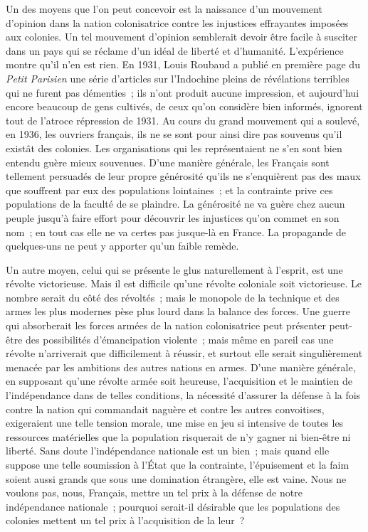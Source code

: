 \documentclass[french,twoside]{book} %
\begin{document}
\noindent Un des moyens que l'on peut concevoir est la naissance d'un mouvement d'opinion dans la nation colonisatrice contre les injustices effrayantes imposées aux colonies. Un tel mouvement d'opinion semblerait devoir être facile à susciter dans un pays qui se réclame d'un idéal de liberté et d'humanité. L'expérience montre qu'il n'en est rien. En 1931, Louis Roubaud a publié en première page du {\itshape Petit Parisien} une série d'articles sur l'Indochine pleins de révélations terribles qui ne furent pas démenties ; ils n'ont produit aucune impression, et aujourd'hui encore beaucoup de gens cultivés, de ceux qu'on considère bien informés, ignorent tout de l'atroce répression de 1931. Au cours du grand mouvement qui a soulevé, en 1936, les ouvriers français, ils ne se sont pour ainsi dire pas souvenus qu'il existât des colonies. Les organisations qui les représentaient ne s'en sont bien entendu guère mieux souvenues. D'une manière générale, les Français sont tellement persuadés de leur propre générosité qu'ils ne s'enquièrent pas des maux que souffrent par eux des populations lointaines ; et la contrainte prive ces populations de la faculté de se plaindre. La générosité ne va guère chez aucun peuple jusqu'à faire effort pour découvrir les injustices qu'on commet en son nom ; en tout cas elle ne va certes pas jusque-là en France. La propagande de quelques-uns ne peut y apporter qu'un faible remède.\par
Un autre moyen, celui qui se présente le glus naturellement à l'esprit, est une révolte victorieuse. Mais il est difficile qu'une révolte coloniale soit victorieuse. Le nombre serait du côté des révoltés ; mais le monopole de la technique et des armes les plus modernes pèse plus lourd dans la balance des forces. Une guerre qui absorberait les forces armées de la nation colonisatrice peut présenter peut-être des possibilités d'émancipation violente ; mais même en pareil cas une révolte n'arriverait que difficilement à réussir, et surtout elle serait singulièrement menacée par les ambitions des autres nations en armes. D'une manière générale, en supposant qu'une révolte armée soit heureuse, l'acquisition et le maintien de l'indépendance dans de telles conditions, la nécessité d'assurer la défense à la fois contre la nation qui commandait naguè­re et contre les autres convoitises, exigeraient une telle tension morale, une mise en jeu si intensive de toutes les ressources matérielles que la population risquerait de n'y gagner ni bien-être ni liberté. Sans doute l'indépendance nationale est un bien ; mais quand elle suppose une telle soumission à l'État que la contrainte, l'épuisement et la faim soient aussi grands que sous une domination étrangère, elle est vaine. Nous ne voulons pas, nous, Français, mettre un tel prix à la défense de notre indépendance nationale ; pourquoi serait-il désirable que les populations des colonies mettent un tel prix à l'acquisition de la leur ?\par
\end{document}
